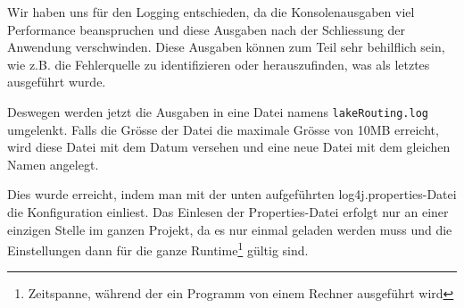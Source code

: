 Wir haben uns für den Logging entschieden, da die Konsolenausgaben viel
Performance beanspruchen und diese Ausgaben nach der Schliessung der Anwendung
verschwinden. Diese Ausgaben können zum Teil sehr behilflich sein, wie z.B.
die Fehlerquelle zu identifizieren oder herauszufinden, was als letztes
ausgeführt wurde. 

Deswegen werden jetzt die Ausgaben in eine Datei namens
\texttt{lakeRouting.log} umgelenkt. Falls die Grösse der Datei die maximale
Grösse von 10MB erreicht, wird diese Datei mit dem Datum versehen und eine
neue Datei mit dem gleichen Namen angelegt.

Dies wurde erreicht, indem man mit der unten aufgeführten
log4j.properties-Datei die Konfiguration einliest. Das Einlesen der
Properties-Datei erfolgt nur an einer einzigen Stelle im ganzen Projekt, da es
nur einmal geladen werden muss und die Einstellungen dann für die ganze
Runtime\footnote{Zeitspanne, während der ein Programm von einem Rechner
ausgeführt wird} gültig sind.



